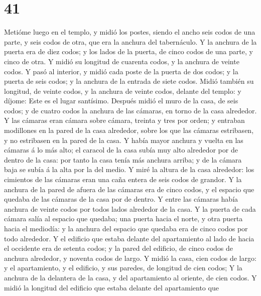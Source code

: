 \hypertarget{section-40}{%
\section{41}\label{section-40}}

 Metióme luego en el templo, y midió los postes, siendo el
ancho seis codos de una parte, y seis codos de otra, que era la anchura
del tabernáculo.  Y la anchura de la puerta era de diez
codos; y los lados de la puerta, de cinco codos de una parte, y cinco de
otra. Y midió su longitud de cuarenta codos, y la anchura de veinte
codos.  Y pasó al interior, y midió cada poste de la
puerta de dos codos; y la puerta de seis codos; y la anchura de la
entrada de siete codos.  Midió también su longitud, de
veinte codos, y la anchura de veinte codos, delante del templo: y
díjome: Este es el lugar santísimo.  Después midió el muro
de la casa, de seis codos; y de cuatro codos la anchura de las cámaras,
en torno de la casa alrededor.  Y las cámaras eran cámara
sobre cámara, treinta y tres por orden; y entraban modillones en la
pared de la casa alrededor, sobre los que las cámaras estribasen, y no
estribasen en la pared de la casa.  Y había mayor anchura
y vuelta en las cámaras á lo más alto; el caracol de la casa subía muy
alto alrededor por de dentro de la casa: por tanto la casa tenía más
anchura arriba; y de la cámara baja se subía á la alta por la del medio.
 Y miré la altura de la casa alrededor: los cimientos de
las cámaras eran una caña entera de seis codos de grandor.
 Y la anchura de la pared de afuera de las cámaras era de
cinco codos, y el espacio que quedaba de las cámaras de la casa por de
dentro.  Y entre las cámaras había anchura de veinte
codos por todos lados alrededor de la casa.  Y la puerta
de cada cámara salía al espacio que quedaba; una puerta hacia el norte,
y otra puerta hacia el mediodía: y la anchura del espacio que quedaba
era de cinco codos por todo alrededor.  Y el edificio que
estaba delante del apartamiento al lado de hacia el occidente era de
setenta codos; y la pared del edificio, de cinco codos de anchura
alrededor, y noventa codos de largo.  Y midió la casa,
cien codos de largo: y el apartamiento, y el edificio, y sus paredes, de
longitud de cien codos;  Y la anchura de la delantera de
la casa, y del apartamiento al oriente, de cien codos.  Y
midió la longitud del edificio que estaba delante del apartamiento que
